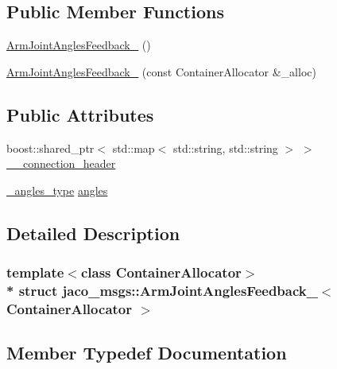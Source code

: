 \subsection*{Public Member Functions}
\begin{DoxyCompactItemize}
\item 
\hyperlink{structjaco__msgs_1_1ArmJointAnglesFeedback___a1b724cd9d7615430769343b3c9e02d9d}{Arm\+Joint\+Angles\+Feedback\+\_\+} ()
\item 
\hyperlink{structjaco__msgs_1_1ArmJointAnglesFeedback___adf67eb02ce79ee9fc1040be6196a4178}{Arm\+Joint\+Angles\+Feedback\+\_\+} (const Container\+Allocator \&\+\_\+alloc)
\end{DoxyCompactItemize}
\subsection*{Public Attributes}
\begin{DoxyCompactItemize}
\item 
boost\+::shared\+\_\+ptr$<$ std\+::map$<$ std\+::string, std\+::string $>$ $>$ \hyperlink{structjaco__msgs_1_1ArmJointAnglesFeedback___a547962cfc4323f540ed623b6c1bea2a7}{\+\_\+\+\_\+connection\+\_\+header}
\item 
\hyperlink{structjaco__msgs_1_1ArmJointAnglesFeedback___a629bebf796b19c402987a577a7713b39}{\+\_\+angles\+\_\+type} \hyperlink{structjaco__msgs_1_1ArmJointAnglesFeedback___a5b3d327fd594aa0715666bf1c95359e4}{angles}
\end{DoxyCompactItemize}


\subsection{Detailed Description}
\subsubsection*{template$<$class Container\+Allocator$>$\\*
struct jaco\+\_\+msgs\+::\+Arm\+Joint\+Angles\+Feedback\+\_\+$<$ Container\+Allocator $>$}



\subsection{Member Typedef Documentation}

